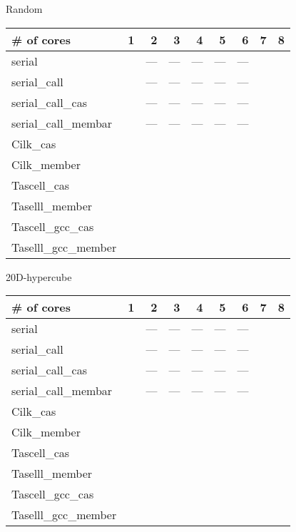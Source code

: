 \documentclass{article}
\begin{document}
Random
\begin{tabular}{l|r|r|r|r|r|r|r|r}
\# of cores  &1&2&3&4&5&6&7&8 \\ \hline \hline
serial               & &---&---&---&---&---& \\ \hline
serial\_call         & &---&---&---&---&---& \\ \hline
serial\_call\_cas    & &---&---&---&---&---& \\ \hline
serial\_call\_membar & &---&---&---&---&---& \\ \hline
Cilk\_cas            & & & & & & & \\ \hline
Cilk\_member         & & & & & & & \\ \hline
Tascell\_cas         & & & & & & & \\ \hline
Taselll\_member      & & & & & & & \\ \hline
Tascell\_gcc\_cas    & & & & & & & \\ \hline
Taselll\_gcc\_member & & & & & & & \\
\end{tabular}

20D-hypercube
\begin{tabular}{l|r|r|r|r|r|r|r|r}
\# of cores  &1&2&3&4&5&6&7&8 \\ \hline \hline
serial               & &---&---&---&---&---& \\ \hline
serial\_call         & &---&---&---&---&---& \\ \hline
serial\_call\_cas    & &---&---&---&---&---& \\ \hline
serial\_call\_membar & &---&---&---&---&---& \\ \hline
Cilk\_cas            & & & & & & & \\ \hline
Cilk\_member         & & & & & & & \\ \hline
Tascell\_cas         & & & & & & & \\ \hline
Taselll\_member      & & & & & & & \\ \hline
Tascell\_gcc\_cas    & & & & & & & \\ \hline
Taselll\_gcc\_member & & & & & & & \\
\end{tabular}
\end{document}
